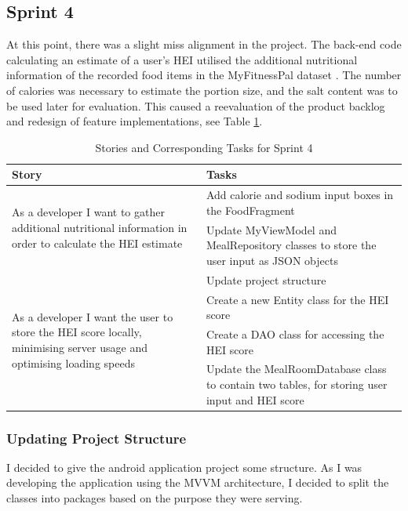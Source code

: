 \documentclass{article}
\begin{document}
\subsection{Sprint 4}
At this point, there was a slight miss alignment in the project. The back-end code calculating an estimate of a user's HEI utilised the additional nutritional information of the recorded food items in the MyFitnessPal dataset \cite{diet_success_predictions}. The number of calories was necessary to estimate the portion size, and the salt content was to be used later for evaluation. This caused a reevaluation of the product backlog and redesign of feature implementations, see Table \ref{table:stories_tasks_sprint_4}.

\begin{table}[h]
\centering
\hspace*{-2.1cm}
\begin{tabular}{||m{6cm}|m{9cm}||}
\hline
    Story & Tasks \\ [0.5ex] 
    \hline
    \multirow{2}{\hsize}{As a developer I want to gather additional nutritional information in order to calculate the HEI estimate} 
                                            & Add calorie and sodium input boxes in the FoodFragment \\\cline{2-2}
                                            & Update MyViewModel and MealRepository classes to store the user input as JSON objects \\
    \hline
    \multirow{4}{\hsize}{As a developer I want the user to store the HEI score locally, minimising server usage and optimising loading speeds}
                                                        & Update project structure \\\cline{2-2}
                                                        & Create a new Entity class for the HEI score \\\cline{2-2}
                                                        & Create a DAO class for accessing the HEI score \\\cline{2-2}
                                                        & Update the MealRoomDatabase class to contain two tables, for storing user input and HEI score \\
\hline
\end{tabular}
\caption{Stories and Corresponding Tasks for Sprint 4}
\label{table:stories_tasks_sprint_4}
\end{table}

\subsubsection{Updating Project Structure}
I decided to give the android application project some structure. As I was developing the application using the MVVM architecture, I decided to split the classes into packages based on the purpose they were serving.
\end{document}
